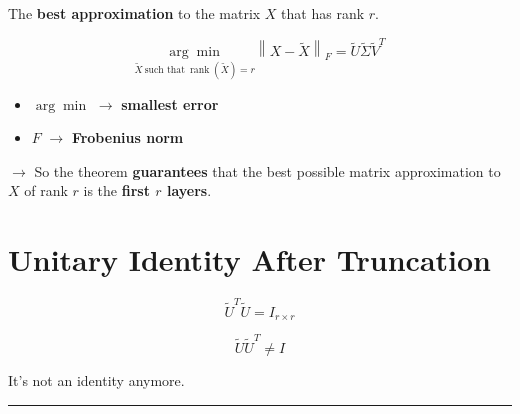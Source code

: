 \documentclass[11pt,a4paper]{article}
\newcommand{\norm}[1]{\left\lVert #1 \right\rVert}
\begin{document}
\begin{callout}
The \textbf{best approximation} to the matrix $X$ that has rank $r$.
\end{callout}

\[
  \underset{\tilde{X}\ \text{such that}\ \operatorname{rank}(\tilde{X}) = r}{\arg\min}
  \norm{X - \tilde{X}}_F = \tilde{U} \tilde{\Sigma} \tilde{V}^T
\]

\begin{itemize}
  \item $\arg\min$ $\rightarrow$ \textbf{smallest error}
  \item $F$ $\rightarrow$ \textbf{Frobenius norm}
\end{itemize}

$\rightarrow$ So the theorem \textbf{guarantees} that the best possible matrix approximation to $X$ of rank $r$ is the \textbf{first $r$ layers}.

\section{Unitary Identity After Truncation}

\[
  \tilde{U}^T \tilde{U} = I_{r \times r}
\]

\[
  \tilde{U} \tilde{U}^T \neq I
\]

\begin{callout}
It's not an identity anymore.
\end{callout}



\vspace{6pt}
\hrule
\vspace{6pt}
\end{document}
